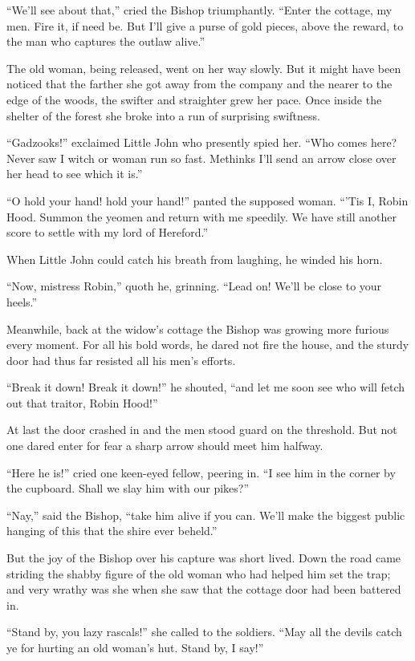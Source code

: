 ``We'll see about that,'' cried the Bishop triumphantly. ``Enter the
cottage, my men. Fire it, if need be. But I'll give a purse of gold
pieces, above the reward, to the man who captures the outlaw alive.''

The old woman, being released, went on her way slowly. But it might have
been noticed that the farther she got away from the company and the
nearer to the edge of the woods, the swifter and straighter grew her
pace. Once inside the shelter of the forest she broke into a run of
surprising swiftness.

``Gadzooks!'' exclaimed Little John who presently spied her. ``Who comes
here? Never saw I witch or woman run so fast. Methinks I'll send an
arrow close over her head to see which it is.''

``O hold your hand! hold your hand!'' panted the supposed woman. ``'Tis
I, Robin Hood. Summon the yeomen and return with me speedily. We have
still another score to settle with my lord of Hereford.''

When Little John could catch his breath from laughing, he winded his
horn.

``Now, mistress Robin,'' quoth he, grinning. ``Lead on! We'll be close
to your heels.''

Meanwhile, back at the widow's cottage the Bishop was growing more
furious every moment. For all his bold words, he dared not fire the
house, and the sturdy door had thus far resisted all his men's efforts.

``Break it down! Break it down!'' he shouted, ``and let me soon see who
will fetch out that traitor, Robin Hood!''

At last the door crashed in and the men stood guard on the threshold.
But not one dared enter for fear a sharp arrow should meet him halfway.

``Here he is!'' cried one keen-eyed fellow, peering in. ``I see him in
the corner by the cupboard. Shall we slay him with our pikes?''

``Nay,'' said the Bishop, ``take him alive if you can. We'll make the
biggest public hanging of this that the shire ever beheld.''

But the joy of the Bishop over his capture was short lived. Down the
road came striding the shabby figure of the old woman who had helped him
set the trap; and very wrathy was she when she saw that the cottage door
had been battered in.

``Stand by, you lazy rascals!'' she called to the soldiers. ``May all
the devils catch ye for hurting an old woman's hut. Stand by, I say!''

